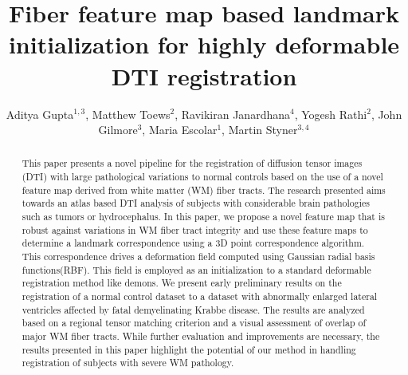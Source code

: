 \documentclass{llncs}
\begin{document}
%
\frontmatter          %
%
\pagestyle{headings}  %
\mainmatter              %
%
\title{Fiber feature map based landmark initialization for highly deformable DTI registration}
\author{Aditya Gupta$^{1,3}$, Matthew Toews$^{2}$, Ravikiran Janardhana$^{4}$, Yogesh Rathi$^{2}$, John Gilmore$^{3}$, Maria Escolar$^{1}$, Martin Styner$^{3,4}$}




\maketitle              %


\begin{abstract}
This paper presents a novel pipeline for the registration of diffusion tensor images (DTI) with large pathological
variations to normal controls based on the use of a novel feature map derived from white matter (WM) fiber
tracts. The research presented aims towards an atlas based DTI analysis of subjects with considerable brain
pathologies such as tumors or hydrocephalus. In this paper, we propose a novel feature map that is robust against
variations in WM fiber tract integrity and use these feature maps to determine a landmark correspondence using
a 3D point correspondence algorithm. This correspondence drives a deformation field computed using Gaussian
radial basis functions(RBF). This field is employed as an initialization to a standard deformable registration
method like demons. We present early preliminary results on the registration of a normal control dataset to a
dataset with abnormally enlarged lateral ventricles affected by fatal demyelinating Krabbe disease. The results
are analyzed based on a regional tensor matching criterion and a visual assessment of overlap of major WM fiber
tracts. While further evaluation and improvements are necessary, the results presented in this paper highlight
the potential of our method in handling registration of subjects with severe WM pathology.

\end{abstract}
\end{document}
